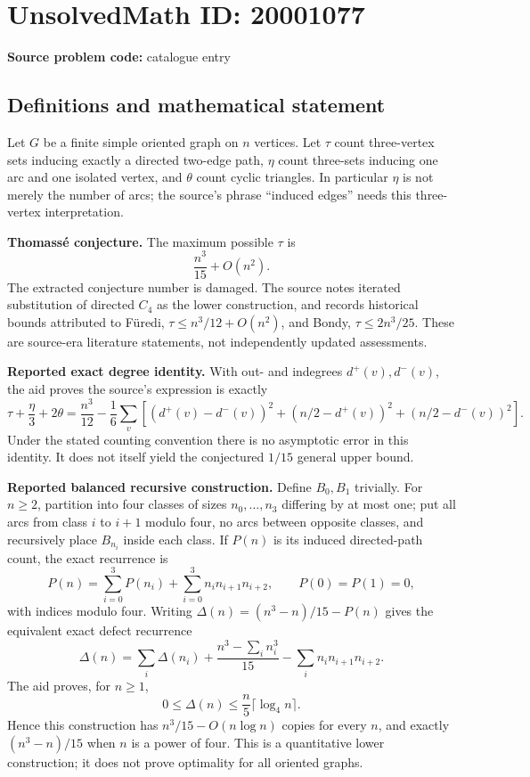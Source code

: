 \documentclass[11pt]{article}
\begin{document}
\section*{UnsolvedMath ID: 20001077}
\textbf{Source problem code:} catalogue entry
\subsection{Definitions and mathematical statement}
Let $G$ be a finite simple oriented graph on $n$ vertices. Let $\tau$ count three-vertex sets inducing exactly a directed two-edge path, $\eta$ count three-sets inducing one arc and one isolated vertex, and $\theta$ count cyclic triangles. In particular $\eta$ is not merely the number of arcs; the source's phrase ``induced edges'' needs this three-vertex interpretation.

\textbf{Thomass\'e conjecture.} The maximum possible $\tau$ is
\[
 \frac{n^3}{15}+O(n^2).
\]
The extracted conjecture number is damaged. The source notes iterated substitution of directed $C_4$ as the lower construction, and records historical bounds attributed to F\"uredi, $\tau\leq n^3/12+O(n^2)$, and Bondy, $\tau\leq2n^3/25$. These are source-era literature statements, not independently updated assessments.

\textbf{Reported exact degree identity.} With out- and indegrees $d^+(v),d^-(v)$, the aid proves the source's expression is exactly
\[
 \tau+\frac\eta3+2\theta=\frac{n^3}{12}
 -\frac16\sum_v\left[(d^+(v)-d^-(v))^2+
 (n/2-d^+(v))^2+(n/2-d^-(v))^2\right].
\]
Under the stated counting convention there is no asymptotic error in this identity. It does not itself yield the conjectured $1/15$ general upper bound.

\textbf{Reported balanced recursive construction.} Define $B_0,B_1$ trivially. For $n\geq2$, partition into four classes of sizes $n_0,\ldots,n_3$ differing by at most one; put all arcs from class $i$ to $i+1$ modulo four, no arcs between opposite classes, and recursively place $B_{n_i}$ inside each class. If $P(n)$ is its induced directed-path count, the exact recurrence is
\[
 P(n)=\sum_{i=0}^3P(n_i)+\sum_{i=0}^3n_i n_{i+1}n_{i+2},\qquad P(0)=P(1)=0,
\]
with indices modulo four. Writing $\Delta(n)=(n^3-n)/15-P(n)$ gives the equivalent exact defect recurrence
\[
 \Delta(n)=\sum_i\Delta(n_i)+\frac{n^3-\sum_i n_i^3}{15}
 -\sum_i n_i n_{i+1}n_{i+2}.
\]
The aid proves, for $n\geq1$,
\[
 0\leq\Delta(n)\leq\frac n5\lceil\log_4n\rceil.
\]
Hence this construction has $n^3/15-O(n\log n)$ copies for every $n$, and exactly $(n^3-n)/15$ when $n$ is a power of four. This is a quantitative lower construction; it does not prove optimality for all oriented graphs.
\end{document}
